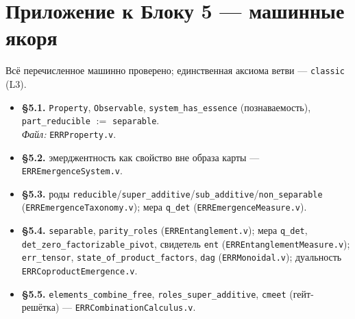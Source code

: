 \documentclass[12pt,a4paper]{article}
\begin{document}
\section*{Приложение к Блоку 5 — машинные якоря}
\small\raggedright\sloppy
\noindent Всё перечисленное машинно проверено; единственная аксиома ветви --- \texttt{classic} (L3).

\begin{itemize}\itemsep2pt
\item \textbf{§5.1.} \texttt{Property}, \texttt{Observable}, \texttt{system\_has\_essence}
(познаваемость), \texttt{part\_reducible} ${:=}$ \texttt{separable}.\\
\emph{Файл:} \texttt{ERRProperty.v}.

\item \textbf{§5.2.} эмерджентность как свойство вне образа карты --- \texttt{ERREmergenceSystem.v}.

\item \textbf{§5.3.} роды \texttt{reducible}/\texttt{super\_additive}/\texttt{sub\_additive}/\texttt{non\_separable}
(\texttt{ERREmergenceTaxonomy.v}); мера \texttt{q\_det} (\texttt{ERREmergenceMeasure.v}).

\item \textbf{§5.4.} \texttt{separable}, \texttt{parity\_roles} (\texttt{ERREntanglement.v});
мера \texttt{q\_det}, \texttt{det\_zero\_factorizable\_pivot}, свидетель \texttt{ent}
(\texttt{ERREntanglementMeasure.v}); \texttt{err\_tensor}, \texttt{state\_of\_product\_factors},
\texttt{dag} (\texttt{ERRMonoidal.v}); дуальность \texttt{ERRCoproductEmergence.v}.

\item \textbf{§5.5.} \texttt{elements\_combine\_free}, \texttt{roles\_super\_additive},
\texttt{cmeet} (гейт-решётка) --- \texttt{ERRCombinationCalculus.v}.
\end{itemize}
\normalsize

\end{document}
